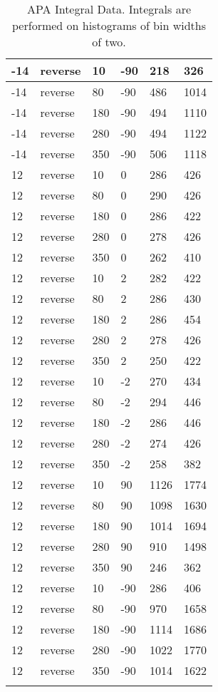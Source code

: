 \begin{longtable}{|l|l|l|l|l|l|}
			-14 & reverse & 10 & -90 & 218 & 326 \\
			\hline
			-14 & reverse & 80 & -90 & 486 & 1014 \\
			\hline
			-14 & reverse & 180 & -90 & 494 & 1110 \\
			\hline
			-14 & reverse & 280 & -90 & 494 & 1122 \\
			\hline
			-14 & reverse & 350 & -90 & 506 & 1118 \\
			\hline
			12 & reverse & 10 & 0 & 286 & 426 \\
			\hline
			12 & reverse & 80 & 0 & 290 & 426 \\
			\hline
			12 & reverse & 180 & 0 & 286 & 422 \\
			\hline
			12 & reverse & 280 & 0 & 278 & 426 \\
			\hline
			12 & reverse & 350 & 0 & 262 & 410 \\
			\hline
			12 & reverse & 10 & 2 & 282 & 422 \\
			\hline
			12 & reverse & 80 & 2 & 286 & 430 \\
			\hline
			12 & reverse & 180 & 2 & 286 & 454 \\
			\hline
			12 & reverse & 280 & 2 & 278 & 426 \\
			\hline
			12 & reverse & 350 & 2 & 250 & 422 \\
			\hline
			12 & reverse & 10 & -2 & 270 & 434 \\
			\hline
			12 & reverse & 80 & -2 & 294 & 446 \\
			\hline
			12 & reverse & 180 & -2 & 286 & 446 \\
			\hline
			12 & reverse & 280 & -2 & 274 & 426 \\
			\hline
			12 & reverse & 350 & -2 & 258 & 382 \\
			\hline
			12 & reverse & 10 & 90 & 1126 & 1774 \\
			\hline
			12 & reverse & 80 & 90 & 1098 & 1630 \\
			\hline
			12 & reverse & 180 & 90 & 1014 & 1694 \\
			\hline
			12 & reverse & 280 & 90 & 910 & 1498 \\
			\hline
			12 & reverse & 350 & 90 & 246 & 362 \\
			\hline
			12 & reverse & 10 & -90 & 286 & 406 \\
			\hline
			12 & reverse & 80 & -90 & 970 & 1658 \\
			\hline
			12 & reverse & 180 & -90 & 1114 & 1686 \\
			\hline
			12 & reverse & 280 & -90 & 1022 & 1770 \\
			\hline
			12 & reverse & 350 & -90 & 1014 & 1622 \\
			\hline
	\caption{APA Integral Data.
	Integrals are performed on histograms of bin widths of two.
	}
	\label{tab:apa_sum}
\end{longtable}